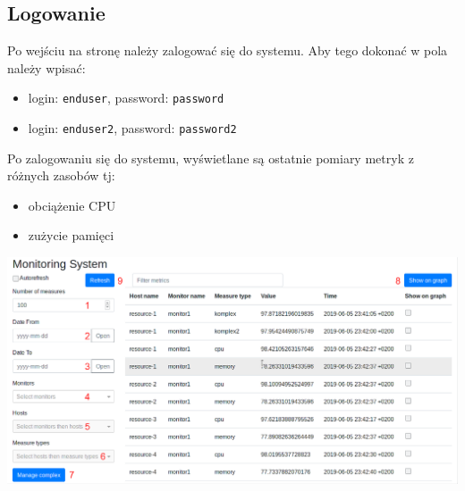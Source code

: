 \documentclass{article}
\begin{document}
\subsection{Logowanie}
Po wejściu na stronę należy zalogować się do systemu. Aby tego dokonać w pola należy wpisać:
\begin{itemize}
\item login: \texttt{enduser}, password: \texttt{password}
\item login: \texttt{enduser2}, password: \texttt{password2}
\end{itemize}
Po zalogowaniu się do systemu, wyświetlane są ostatnie pomiary metryk z różnych zasobów tj:
\begin{itemize}
\item obciążenie CPU
\item zużycie pamięci
\end{itemize}
\includegraphics[width=\linewidth]{../screen/ResourceMonitor.png}

\newpage
\end{document}
